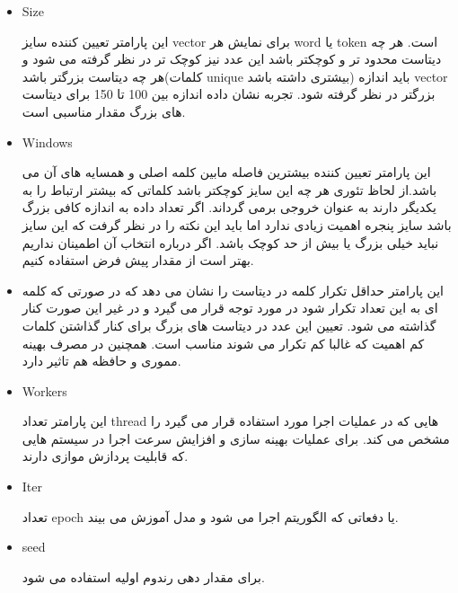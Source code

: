 \documentclass[10pt]{article}
\begin{document}
\begin{itemize}
	\item Size 
	
	این پارامتر تعیین کننده سایز vector برای نمایش هر word یا token است. هر چه دیتاست محدود تر و کوچکتر باشد این عدد نیز کوچک تر در نظر گرفته می شود و هر چه دیتاست بزرگتر باشد(کلمات unique بیشتری داشته باشد) باید اندازه vector بزرگتر در نظر گرفته شود. تجربه نشان داده اندازه بین 100 تا 150 برای دیتاست های بزرگ مقدار مناسبی است.
	
	\item Windows 
	
	این پارامتر تعیین کننده بیشترین فاصله مابین کلمه اصلی و همسایه های آن می باشد.از لحاظ تئوری هر چه این سایز کوچکتر باشد کلماتی که بیشتر ارتباط را به یکدیگر دارند به عنوان خروجی برمی گرداند. اگر تعداد داده به اندازه کافی بزرگ باشد سایز پنجره اهمیت زیادی ندارد اما باید این نکته را در نظر گرفت که این سایز نباید خیلی بزرگ یا بیش از حد کوچک باشد. اگر درباره انتخاب آن اطمینان نداریم بهتر است از مقدار پیش فرض استفاده کنیم.
	
	
	\item {}
	
	این پارامتر حداقل تکرار کلمه در دیتاست را نشان می دهد که در صورتی که کلمه ای به این تعداد تکرار شود در
	 مورد توجه قرار می گیرد و در غیر این صورت کنار گذاشته می شود. تعیین این عدد در دیتاست های بزرگ برای کنار گذاشتن کلمات کم اهمیت که غالبا کم تکرار می شوند مناسب است. همچنین در مصرف بهینه مموری و حافظه هم تاثیر دارد.
	
	 
	\item Workers
	
	این پارامتر تعداد thread هایی که در عملیات اجرا مورد استفاده قرار می گیرد را مشخص می کند. برای عملیات بهینه سازی و افزایش سرعت اجرا در سیستم هایی که قابلیت پردازش موازی دارند.
	
	 
	\item Iter
	
	تعداد epoch یا دفعاتی که الگوریتم اجرا می شود و مدل آموزش می بیند.
	 
	\item seed 
	
	برای مقدار دهی رندوم اولیه استفاده می شود.
\end{itemize}
\iffalse	
\end{document}
